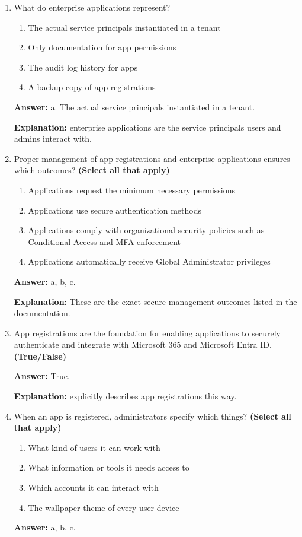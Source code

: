 \documentclass[10pt]{article}
\begin{document}
\begin{enumerate}[leftmargin=*]
\textbf{Explanation:} This is the exact definition provided in the documentation.

\item What do enterprise applications represent?
\begin{enumerate}[label=\alph*., leftmargin=1.5em]
\item The actual service principals instantiated in a tenant
\item Only documentation for app permissions
\item The audit log history for apps
\item A backup copy of app registrations
\end{enumerate}
\textbf{Answer:} a. The actual service principals instantiated in a tenant.

\textbf{Explanation:} enterprise applications are the service principals users and admins interact with.

\item Proper management of app registrations and enterprise applications ensures which outcomes? \textbf{(Select all that apply)}
\begin{enumerate}[label=\alph*., leftmargin=1.5em]
\item Applications request the minimum necessary permissions
\item Applications use secure authentication methods
\item Applications comply with organizational security policies such as Conditional Access and MFA enforcement
\item Applications automatically receive Global Administrator privileges
\end{enumerate}
\textbf{Answer:} a, b, c.

\textbf{Explanation:} These are the exact secure-management outcomes listed in the documentation.

\item App registrations are the foundation for enabling applications to securely authenticate and integrate with Microsoft 365 and Microsoft Entra ID. \textbf{(True/False)}

\textbf{Answer:} True.

\textbf{Explanation:} explicitly describes app registrations this way.

\item When an app is registered, administrators specify which things? \textbf{(Select all that apply)}
\begin{enumerate}[label=\alph*., leftmargin=1.5em]
\item What kind of users it can work with
\item What information or tools it needs access to
\item Which accounts it can interact with
\item The wallpaper theme of every user device
\end{enumerate}
\textbf{Answer:} a, b, c.


\end{enumerate}
\end{document}
